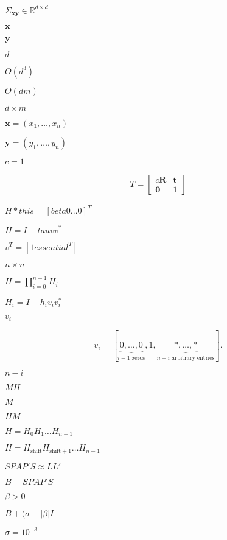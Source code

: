 \documentclass{article}
\begin{document}
$ \Sigma_{\mathbf{x}\mathbf{y}} \in \mathbb{R}^{d \times d} $
\pagebreak

$ \mathbf{x} $
\pagebreak

$ \mathbf{y} $
\pagebreak

$d$
\pagebreak

$O(d^3)$
\pagebreak

$O(dm)$
\pagebreak

$d \times m$
\pagebreak

$ \mathbf{x} = \left( x_1, \hdots, x_n \right) $
\pagebreak

$ \mathbf{y} = \left( y_1, \hdots, y_n \right) $
\pagebreak

$ c=1 $
\pagebreak

\begin{align*}  T = \begin{bmatrix} c\mathbf{R} & \mathbf{t} \\ \mathbf{0} & 1 \end{bmatrix}
\end{align*}
\pagebreak

$ H *this = [ beta 0 ... 0]^T $
\pagebreak

$ H = I - tau v v^*$
\pagebreak

$ v^T = [1 essential^T] $
\pagebreak

$ n \times n $
\pagebreak

$ H = \prod_{i=0}^{n-1} H_i $
\pagebreak

$ H_i = I - h_i v_i
v_i^* $
\pagebreak

$v_i $
\pagebreak

\[v_i = [\underbrace{0, \ldots, 0}_{i-1\mbox{ zeros}}, 1, \underbrace{*, \ldots,*}_{n-i\mbox{ arbitrary entries}} ].
\]
\pagebreak

$ n-i $
\pagebreak

$ MH $
\pagebreak

$ M $
\pagebreak

$ HM $
\pagebreak

$ H = H_0 H_1 \ldots H_{n-1} $
\pagebreak

$ H = H_{\mathrm{shift}}
H_{\mathrm{shift}+1} \ldots H_{n-1} $
\pagebreak

$ S P A P' S \approx L L' $
\pagebreak

$ B = S P A P' S $
\pagebreak

$ \beta > 0 $
\pagebreak

$ B + (\sigma+|\beta| I $
\pagebreak

$ \sigma = 10^{-3} $
\pagebreak
\end{document}
